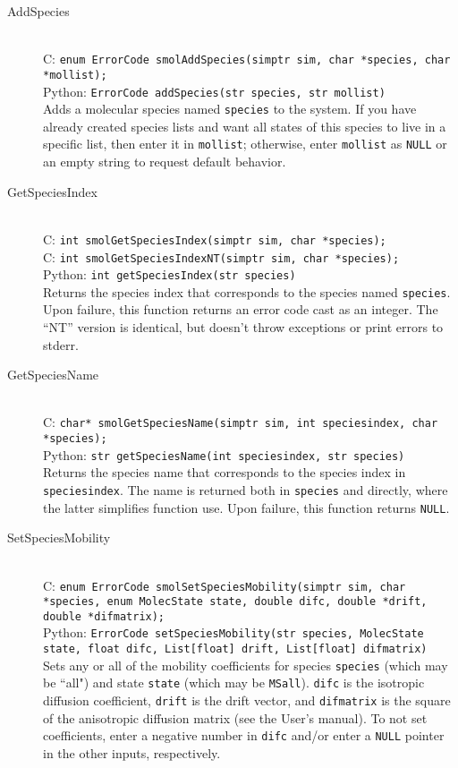 \documentclass {book}
\begin{document}
\begin{description}

\item[AddSpecies]
\hfill \\
C: \texttt{enum ErrorCode smolAddSpecies(simptr sim, char *species, char *mollist);}\\
Python: \texttt{ErrorCode addSpecies(str species, str mollist)}\\
Adds a molecular species named \texttt{species} to the system. If you have already created species lists and want all states of this species to live in a specific list, then enter it in \texttt{mollist}; otherwise, enter \texttt{mollist} as \texttt{NULL} or an empty string to request default behavior.

\item[GetSpeciesIndex]
\hfill \\
C: \texttt{int smolGetSpeciesIndex(simptr sim, char *species);}\\
C: \texttt{int smolGetSpeciesIndexNT(simptr sim, char *species);}\\
Python: \texttt{int getSpeciesIndex(str species)}\\
Returns the species index that corresponds to the species named \texttt{species}. Upon failure, this function returns an error code cast as an integer. The ``NT'' version is identical, but doesn't throw exceptions or print errors to stderr.

\item[GetSpeciesName]
\hfill \\
C: \texttt{char* smolGetSpeciesName(simptr sim, int speciesindex, char *species);}\\
Python: \texttt{str getSpeciesName(int speciesindex, str species)}\\
Returns the species name that corresponds to the species index in \texttt{speciesindex}. The name is returned both in \texttt{species} and directly, where the latter simplifies function use. Upon failure, this function returns \texttt{NULL}.

\item[SetSpeciesMobility]
\hfill \\
C: \texttt{enum ErrorCode smolSetSpeciesMobility(simptr sim, char *species, enum MolecState state, double difc, double *drift, double *difmatrix);}\\
Python: \texttt{ErrorCode setSpeciesMobility(str species, MolecState state, float difc, List[float] drift, List[float] difmatrix)}\\
Sets any or all of the mobility coefficients for species \texttt{species} (which may be ``all") and state \texttt{state} (which may be \texttt{MSall}). \texttt{difc} is the isotropic diffusion coefficient, \texttt{drift} is the drift vector, and \texttt{difmatrix} is the square of the anisotropic diffusion matrix (see the User's manual). To not set coefficients, enter a negative number in \texttt{difc} and/or enter a \texttt{NULL} pointer in the other inputs, respectively.


\end{description}
\end{document}
